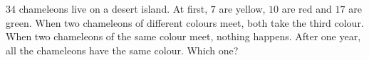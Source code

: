 $34$ chameleons live on a desert island. At first, $7$ are yellow, $10$ are red and $17$ are green. When two chameleons of different colours meet, both take the third colour. When two chameleons of the same colour meet, nothing happens. After one year, all the chameleons have the same colour. Which one?

